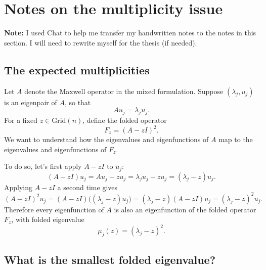 \documentclass[12pt,a4paper]{article}
\begin{document}
\section{Notes on the multiplicity issue}

\textbf{Note:} I used Chat to help me transfer my handwritten notes to the notes in this section. I will need to rewrite myself for the thesis (if needed).


\subsection{The expected multiplicities}


Let $A$ denote the Maxwell operator in the mixed formulation. Suppose
$(\lambda_j,u_j)$ is an eigenpair of $A$, so that
\begin{equation}
    A u_j = \lambda_j u_j .
\end{equation}
For a fixed $z\in \text{Grid}(n)$, define the folded operator
\begin{equation}
    F_z = (A-zI)^2.
\end{equation}
We want to understand how the eigenvalues and eigenfunctions of $A$ map to
the eigenvalues and eigenfunctions of $F_z$.

To do so, let's first apply $A-zI$ to $u_j$:
\begin{equation}
    (A-zI)u_j = A u_j - z u_j
    = \lambda_j u_j - z u_j
    = (\lambda_j-z)u_j .
\end{equation}
Applying $A-zI$ a second time gives
\begin{equation}
    (A-zI)^2 u_j
    = (A-zI)\bigl((\lambda_j-z)u_j\bigr)
    = (\lambda_j-z)(A-zI)u_j
    = (\lambda_j-z)^2 u_j .
\end{equation}
Therefore every eigenfunction of $A$ is also an eigenfunction of the folded
operator $F_z$, with folded eigenvalue
\begin{equation}
    \mu_j(z) = (\lambda_j-z)^2 .
\end{equation}

\subsection{What is the smallest folded eigenvalue?}
\end{document}
